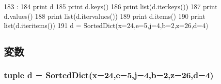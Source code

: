 \begin{DoxyCode}
183                   :
184         print d
185         print d.keys()
186         print list(d.iterkeys())
187         print d.values()
188         print list(d.itervalues())
189         print d.items()
190         print list(d.iteritems())
191 
    d = SortedDict(x=24,e=5,j=4,b=2,z=26,d=4)
\end{DoxyCode}


\subsection{変数}
\hypertarget{namespacem5_1_1util_1_1sorteddict_a59c1414ead6bfdabaeae7361ef56d1eb}{
\subsubsection[{d}]{\setlength{\rightskip}{0pt plus 5cm}tuple {\bf d} = {\bf SortedDict}(x=24,e=5,j=4,b=2,z=26,{\bf d}=4)}}
\label{namespacem5_1_1util_1_1sorteddict_a59c1414ead6bfdabaeae7361ef56d1eb}
